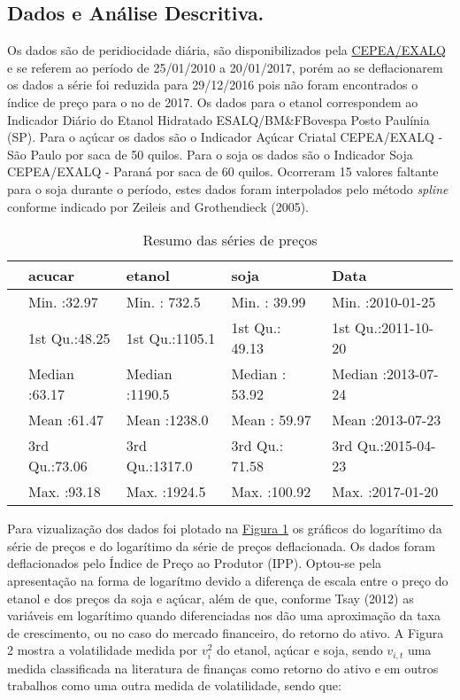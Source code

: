 \documentclass[]{article}
\title{}
\author{}
\date{\today}
\begin{document}
\subsection{Dados e Análise
Descritiva.}\label{dados-e-analise-descritiva.}

Os dados são de peridiocidade diária, são disponibilizados pela
\href{http://www.cepea.esalq.usp.br/br/consultas-ao-banco-de-dados-do-site.aspx}{CEPEA/EXALQ}
e se referem ao período de 25/01/2010 a 20/01/2017, porém ao se
deflacionarem os dados a série foi reduzida para 29/12/2016 pois não
foram encontrados o índice de preço para o no de 2017. Os dados para o
etanol correspondem ao Indicador Diário do Etanol Hidratado
ESALQ/BM\&FBovespa Posto Paulínia (SP). Para o açúcar os dados são o
Indicador Açúcar Criatal CEPEA/EXALQ - São Paulo por saca de 50 quilos.
Para o soja os dados são o Indicador Soja CEPEA/EXALQ - Paraná por saca
de 60 quilos. Ocorreram 15 valores faltante para o soja durante o
período, estes dados foram interpolados pelo método \emph{spline}
conforme indicado por Zeileis and Grothendieck (2005).

\begin{longtable}[t]{lllll}
\caption{\label{tab:unnamed-chunk-5}Resumo das séries de preços}\\
\toprule
  &     acucar &     etanol &      soja &      Data\\
\midrule
 & Min.   :32.97 & Min.   : 732.5 & Min.   : 39.99 & Min.   :2010-01-25\\
 & 1st Qu.:48.25 & 1st Qu.:1105.1 & 1st Qu.: 49.13 & 1st Qu.:2011-10-20\\
 & Median :63.17 & Median :1190.5 & Median : 53.92 & Median :2013-07-24\\
 & Mean   :61.47 & Mean   :1238.0 & Mean   : 59.97 & Mean   :2013-07-23\\
 & 3rd Qu.:73.06 & 3rd Qu.:1317.0 & 3rd Qu.: 71.58 & 3rd Qu.:2015-04-23\\
 & Max.   :93.18 & Max.   :1924.5 & Max.   :100.92 & Max.   :2017-01-20\\
\bottomrule
\end{longtable}

Para vizualização dos dados foi plotado na
\protect\hyperlink{figura1}{Figura 1} os gráficos do logarítimo da série
de preços e do logarítimo da série de preços deflacionada. Os dados
foram deflacionados pelo Índice de Preço ao Produtor (IPP). Optou-se
pela apresentação na forma de logarítmo devido a diferença de escala
entre o preço do etanol e dos preços da soja e açúcar, além de que,
conforme Tsay (2012) as variáveis em logarítimo quando diferenciadas nos
dão uma aproximação da taxa de crescimento, ou no caso do mercado
financeiro, do retorno do ativo. A Figura 2 mostra a volatilidade medida
por \(v_i^2\) do etanol, açúcar e soja, sendo \(v_{i,t}\) uma medida
classificada na literatura de finanças como retorno do ativo e em outros
trabalhos como uma outra medida de volatilidade, sendo que:
\end{document}
